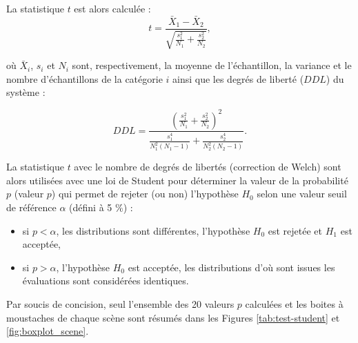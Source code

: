 La statistique $t$ est alors calculée :
\begin{equation}
t = \frac{\bar{X}_1-\bar{X}_2}{\sqrt{\frac{s_1^2}{N_1}+\frac{s_2^2}{N_2}}},
\end{equation}

où $\bar{X}_i$, $s_i$ et $N_i$ sont, respectivement, la moyenne de l'échantillon, la variance et le nombre d'échantillons de la catégorie $i$ ainsi que les degrés de liberté ($DDL$) du système :  

\begin{equation}
DDL = \frac{\left(\frac{s_1^2}{N_1}+\frac{s_2^2}{N_2} \right)^2}{\frac{s_1^4}{N_1^2(N_1-1)}+\frac{s_2^4}{N_2^2(N_2-1)}}.
\end{equation}

La statistique $t$ avec le nombre de degrés de libertés (correction de Welch) sont alors utilisées avec une loi de Student pour déterminer la valeur de la probabilité $p$ (valeur $p$) qui permet de rejeter (ou non) l'hypothèse $H_0$ selon une valeur seuil de référence $\alpha$ (défini à 5 $\%$) :

\begin{itemize}
\item si $p < \alpha$, les distributions sont différentes, l'hypothèse $H_0$ est rejetée et $H_1$ est acceptée,
\item si $p > \alpha$, l'hypothèse $H_0$ est acceptée, les distributions d'où sont issues les évaluations sont considérées identiques.\\
\end{itemize}

Par soucis de concision, seul l'ensemble des 20 valeurs $p$ calculées et les boites à moustaches de chaque scène sont résumés dans les Figures \ref{tab:test-student} et \ref{fig:boxplot_scene}.

